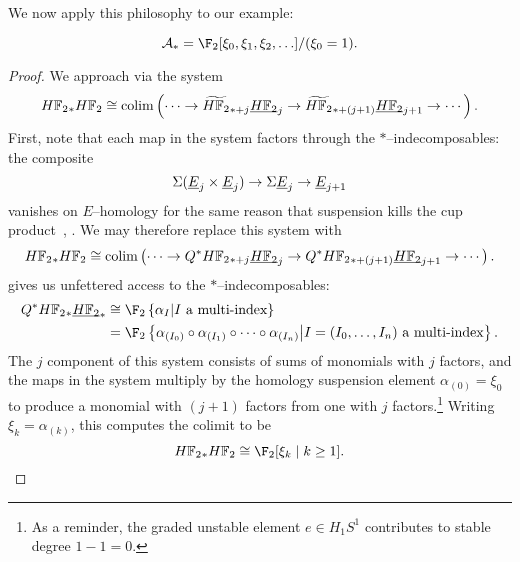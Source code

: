 We now apply this philosophy to our example:
\begin{corollary}\label{StarIndecompsInUDualSteenrodAlg}
\[\mathcal A_* = \F_2[\xi_0, \xi_1, \xi_2, \ldots]/(\xi_0 = 1).\]
\end{corollary}
\begin{proof}
We approach via the system \[\HFtwo_* \HFtwo \cong \colim\left( \cdots \to \widetilde{\HFtwo}_{*+j} \OS{\HFtwo}{j} \to \widetilde{\HFtwo}_{*+(j+1)} \OS{\HFtwo}{j+1} \to \cdots \right).\]  First, note that each map in the system factors through the \(\ast\)--indecomposables: the composite \[\Susp(\OS{E}{j} \times \OS{E}{j}) \to \Susp \OS{E}{j} \to \OS{E}{j+1}\] vanishes on \(E\)--homology for the same reason that suspension kills the cup product~\cite[Corollary 2.18]{BJW}, \cite[Proposition 13.65]{Switzer}.  We may therefore replace this system with \[\HFtwo_* \HFtwo \cong \colim\left( \cdots \to Q^* \HFtwo_{*+j} \OS{\HFtwo}{j} \to Q^* \HFtwo_{*+(j+1)} \OS{\HFtwo}{j+1} \to \cdots \right).\]   gives us unfettered access to the \(\ast\)--indecomposables:
\begin{align*}
Q^\ast \HFtwo_* \OS{\HFtwo}{*} & \cong \F_2\left\{\alpha_{I} \middle| \text{\(I\) a multi-index}\right\} \\
& = \F_2\left\{ \alpha_{(I_0)} \circ \alpha_{(I_1)} \circ \cdots \circ \alpha_{(I_n)} \middle| \text{\(I = (I_0, \ldots, I_n)\) a multi-index}\right\}.
\end{align*}
The \(j\){\th} component of this system consists of sums of monomials with \(j\) factors, and the maps in the system multiply by the homology suspension element \(\alpha_{(0)} = \xi_0\) to produce a monomial with \((j+1)\) factors from one with \(j\) factors.\footnote{As a reminder, the graded unstable element \(e \in H_1 S^1\) contributes to stable degree \(1 - 1 = 0\).}  Writing \(\xi_k = \alpha_{(k)}\), this computes the colimit to be \[\HFtwo_* \HFtwo \cong \F_2[\xi_k \mid k \ge 1]. \qedhere\]
\end{proof}

